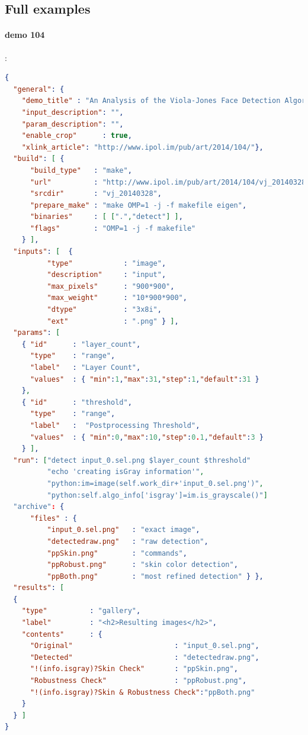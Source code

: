 \subsection{Full examples}

\paragraph{demo 104}: \\
\begin{lstlisting}[language=json,firstnumber=1]
{ 
  "general": { 
    "demo_title" : "An Analysis of the Viola-Jones Face Detection Algorithm",
    "input_description": "",
    "param_description": "",
    "enable_crop"      : true,
    "xlink_article": "http://www.ipol.im/pub/art/2014/104/"}, 
  "build": [ {
      "build_type"   : "make",
      "url"          : "http://www.ipol.im/pub/art/2014/104/vj_20140328.tar.gz", 
      "srcdir"       : "vj_20140328",
      "prepare_make" : "make OMP=1 -j -f makefile eigen",
      "binaries"     : [ [".","detect"] ],
      "flags"        : "OMP=1 -j -f makefile"
    } ],
  "inputs": [  {
          "type"            : "image", 
          "description"     : "input",
          "max_pixels"      : "900*900",
          "max_weight"      : "10*900*900",
          "dtype"           : "3x8i",
          "ext"             : ".png" } ],
  "params": [ 
    { "id"      : "layer_count",
      "type"    : "range", 
      "label"   : "Layer Count",
      "values"  : { "min":1,"max":31,"step":1,"default":31 }
    },
    { "id"      : "threshold",
      "type"    : "range",
      "label"   :  "Postprocessing Threshold",
      "values"  : { "min":0,"max":10,"step":0.1,"default":3 }
    } ],
  "run": ["detect input_0.sel.png $layer_count $threshold"
          "echo 'creating isGray information'",
          "python:im=image(self.work_dir+'input_0.sel.png')",
          "python:self.algo_info['isgray']=im.is_grayscale()"]
  "archive": {
      "files" : { 
          "input_0.sel.png"   : "exact image",
          "detectedraw.png"   : "raw detection",
          "ppSkin.png"        : "commands",
          "ppRobust.png"      : "skin color detection",
          "ppBoth.png"        : "most refined detection" } },
  "results": [
  {
    "type"          : "gallery",
    "label"         : "<h2>Resulting images</h2>",
    "contents"      : { 
      "Original"                        : "input_0.sel.png", 
      "Detected"                        : "detectedraw.png",
      "!(info.isgray)?Skin Check"       : "ppSkin.png",
      "Robustness Check"                : "ppRobust.png",
      "!(info.isgray)?Skin & Robustness Check":"ppBoth.png"
    }
  } ]
}
\end{lstlisting}

